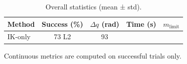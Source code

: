 \begin{table}[t]
\centering
\caption{Overall statistics (mean ± std).}
\label{tab:overall_stats}
\begin{tabular}{lcccc}
\toprule
Method & Success (\%) & $\Delta q$ (rad) & Time (s) & $m_{\mathrm{limit}}$ \\
\midrule
IK-only & 73%
L2 & 93%
\bottomrule
\end{tabular}
\vspace{0.5mm}
{\footnotesize Continuous metrics are computed on successful trials only.}
\end{table}